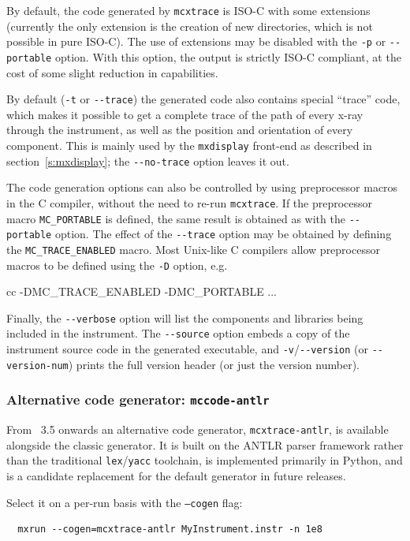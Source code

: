 By default, the code generated by \texttt{mcxtrace} is ISO-C with
some extensions (currently the only extension is the creation of new
directories, which is not possible in pure ISO-C). The use of
extensions may be disabled with the \verb+-p+ or \verb+--portable+
option. With this option, the output is strictly ISO-C compliant, at
the cost of some slight reduction in capabilities.

By default (\verb+-t+ or \verb+--trace+) the generated code also contains
special ``trace'' code, which makes it possible to get a complete trace of the
path of every x-ray through the instrument, as well as the position
and orientation of every component. This is mainly used by the
\verb+mxdisplay+ front-end as described in section~\ref{s:mxdisplay}; the
\verb+--no-trace+ option leaves it out.

The code generation options can also be controlled by using preprocessor
macros in the C compiler, without the need to re-run \texttt{mcxtrace}.
If the preprocessor macro \verb+MC_PORTABLE+ is defined, the
same result is obtained as with the \verb+--portable+ option.
The effect of the \verb+--trace+ option may be obtained
by defining the \verb+MC_TRACE_ENABLED+ macro. Most Unix-like C
compilers allow preprocessor macros to be defined using the \verb+-D+
option, e.g.
\begin{bash}
    cc -DMC_TRACE_ENABLED -DMC_PORTABLE ...
\end{bash}
Finally, the \verb+--verbose+ option will list the components and libraries being
included in the instrument. The \verb+--source+ option embeds a copy of the
instrument source code in the generated executable, and \verb+-v+/\verb+--version+
(or \verb+--version-num+) prints the full version header (or just the version
number).

\subsubsection{Alternative code generator: \texttt{mccode-antlr}}
\label{s:antlr}

From \MCX~3.5 onwards an alternative code generator,
\texttt{mcxtrace-antlr}, is available alongside the classic generator.
It is built on the ANTLR parser framework rather than the traditional
\texttt{lex}/\texttt{yacc} toolchain, is implemented primarily in Python,
and is a candidate replacement for the default generator in future releases.

Select it on a per-run basis with the \texttt{--cogen} flag:
\begin{verbatim}
  mxrun --cogen=mcxtrace-antlr MyInstrument.instr -n 1e8
\end{verbatim}

